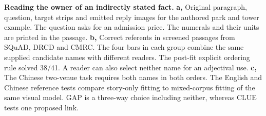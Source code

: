 \textbf{Reading the owner of an indirectly stated fact.}
\textbf{a,} Original paragraph, question, target strips and emitted reply images for the authored park and tower example. The question asks for an admission price. The numerals and their units are printed in the passage. \textbf{b,} Correct referents in screened passages from SQuAD, DRCD and CMRC. The four bars in each group combine the same supplied candidate names with different readers. The post-fit explicit ordering rule solved 38/41. A reader can also select neither name for an adjectival use. \textbf{c,} The Chinese two-venue task requires both names in both orders. The English and Chinese reference tests compare story-only fitting to mixed-corpus fitting of the same visual model. GAP is a three-way choice including neither, whereas CLUE tests one proposed link.
